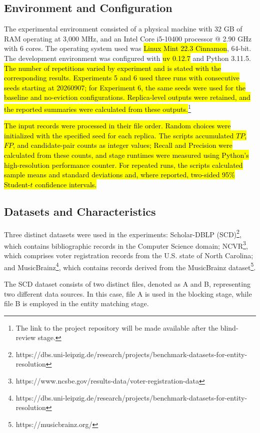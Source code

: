 \documentclass{ieeeaccess}
\begin{document}
\subsection{Environment and Configuration}
The experimental environment consisted of a physical machine with 32 GB of RAM operating at 3{,}000 MHz, and an Intel Core i5-10400 processor @ 2.90 GHz with 6 cores. The operating system used was \hl{Linux Mint 22.3 Cinnamon}, 64-bit. The development environment was configured with \hl{uv 0.12.7} and Python 3.11.5. \hl{The number of repetitions varied by experiment and is stated with the corresponding results. Experiments 5 and 6 used three runs with consecutive seeds starting at 20260907; for Experiment 6, the same seeds were used for the baseline and no-eviction configurations. Replica-level outputs were retained, and the reported summaries were calculated from these outputs.}\footnote{The link to the project repository will be made available after the blind-review stage.}

\hl{The input records were processed in their file order. Random choices were initialized with the specified seed for each replica. The scripts accumulated $TP$, $FP$, and candidate-pair counts as integer values; Recall and Precision were calculated from these counts, and stage runtimes were measured using Python's high-resolution performance counter. For repeated runs, the scripts calculated sample means and standard deviations and, where reported, two-sided 95\% Student-$t$ confidence intervals.}

\subsection{Datasets and Characteristics}
Three distinct datasets were used in the experiments: Scholar-DBLP (SCD)\footnote{https://dbs.uni-leipzig.de/research/projects/benchmark-datasets-for-entity-resolution}, which contains bibliographic records in the Computer Science domain; NCVR\footnote{https://www.ncsbe.gov/results-data/voter-registration-data}, which comprises voter registration records from the U.S. state of North Carolina; and MusicBrainz\footnote{https://dbs.uni-leipzig.de/research/projects/benchmark-datasets-for-entity-resolution}, which contains records derived from the MusicBrainz dataset\footnote{https://musicbrainz.org/}.

The SCD dataset consists of two distinct files, denoted as A and B, representing two different data sources. In this case, file A is used in the blocking stage, while file B is employed in the entity matching stage.
\end{document}
